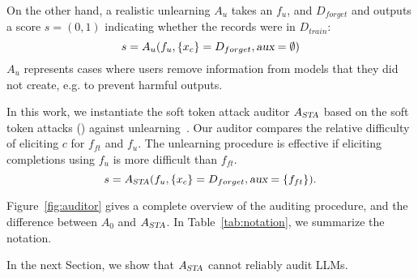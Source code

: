 On the other hand, a realistic unlearning $A_u$ takes an $f_u$, and $D_{forget}$ and outputs a score $s=(0,1)$ indicating whether the records were in $D_{train}$:
\begin{equation}
    s = A_u(f_u, \{x_c\} = D_{forget}, \textsl{aux}=\emptyset)
\end{equation}
$A_u$ represents cases where users remove information from models that they did not create, e.g. to prevent harmful outputs.

In this work, we instantiate the soft token attack auditor $A_\textsl{STA}$ based on the soft token attacks () against unlearning~\cite{schwinn2024soft,zou2024circuitbreakers}.
Our auditor compares the relative difficulty of eliciting $c$ for $f_{ft}$ and $f_u$.
The unlearning procedure is effective if eliciting completions using $f_u$ is more difficult than $f_{ft}$.
\begin{equation}
    s = A_\textsl{STA}(f_u, \{x_c\}=D_{forget}, \textsl{aux}=\{f_{ft}\}).
\end{equation}

Figure~\ref{fig:auditor} gives a complete overview of the auditing procedure, and the difference between $A_0$ and $A_\textsl{STA}$.
In Table~\ref{tab:notation}, we summarize the notation.

In the next Section, we show that $A_\textsl{STA}$ cannot reliably audit LLMs.
